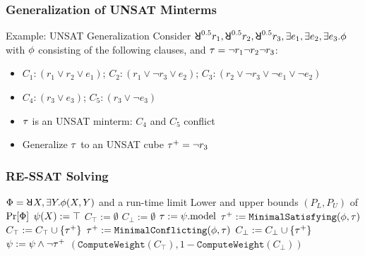 \begin{frame}
    \frametitle{Generalization of UNSAT Minterms}
    \begin{block}{Example: UNSAT Generalization}
        Consider $\random{0.5}r_1,\random{0.5}r_2,\random{0.5}r_3,\exists e_1,\exists e_2,\exists e_3.\pf$ with $\phi$ consisting of the following clauses, and $\tau=\lnot r_1\lnot r_2\lnot r_3$:
        \begin{itemize}
            \item[] $C_1: (r_1 \lor r_2 \lor e_1)$; $C_2: (r_1 \lor \lnot r_3 \lor e_2)$; $C_3: (r_2 \lor \lnot r_3 \lor \lnot e_1 \lor \lnot e_2)$
            \item[] $C_4: (r_3 \lor e_3)$; $C_5: (r_3 \lor \lnot e_3)$
        \end{itemize}
        \begin{itemize}
            \item $\tau$ is an UNSAT minterm: $C_4$ and $C_5$ conflict
            \item Generalize $\tau$ to an UNSAT cube $\tau^+=\lnot r_3$
        \end{itemize}
    \end{block}
\end{frame}

\begin{frame}
    \frametitle{RE-SSAT Solving}
    {\scriptsize
        \begin{algorithmic}[1]
            \REQUIRE
            $\Qf=\random{} X,\exists Y.\pf(X,Y)$ and a run-time limit \timeout
            \ENSURE
            Lower and upper bounds $(P_L,P_U)$ of $\Pr[\Phi]$
            \STATE $\psi(X) := \top$
            \STATE $C_\top := \emptyset$
            \STATE $C_\bot := \emptyset$
            \STATE $\tau := \psi.\mathrm{model}$
            \IF{($\sat{\pcf{\pf}{\as}}$)}
            \STATE $\tau^+ := \texttt{MinimalSatisfying}(\phi,\tau)$
            \STATE $C_\top := C_\top \cup \{\tau^+\}$
            \ELSE
            \STATE $\tau^+ := \texttt{MinimalConflicting}(\phi,\tau)$
            \STATE $C_\bot := C_\bot \cup \{\tau^+\}$
            \ENDIF
            \STATE $\psi := \psi \land \lnot\tau^+$
            \ENDWHILE
            \RETURN $(\texttt{ComputeWeight}(C_\top),1-\texttt{ComputeWeight}(C_\bot))$
        \end{algorithmic}
    }
\end{frame}

